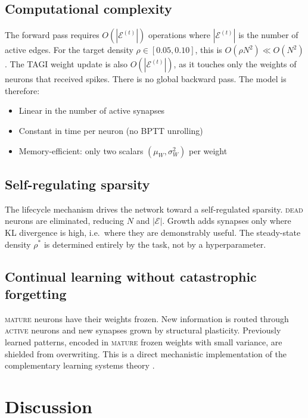 \documentclass[12pt, a4paper]{article}
\newcommand{\mW}{\mu_{W}}
\newcommand{\sW}{\sigma^{2}_{W}}
\begin{document}
\subsection{Computational complexity}

The forward pass requires $O(|\mathcal{E}^{(t)}|)$ operations where
$|\mathcal{E}^{(t)}|$ is the number of active edges. For the target density
$\rho \in [0.05, 0.10]$, this is $O(\rho N^2) \ll O(N^2)$. The TAGI weight update is
also $O(|\mathcal{E}^{(t)}|)$, as it touches only the weights of neurons that received
spikes. There is no global backward pass. The model is therefore:
\begin{itemize}
    \item Linear in the number of active synapses
    \item Constant in time per neuron (no BPTT unrolling)
    \item Memory-efficient: only two scalars $(\mW, \sW)$ per weight
\end{itemize}

\subsection{Self-regulating sparsity}

The lifecycle mechanism drives the network toward a self-regulated sparsity. \textsc{dead}
neurons are eliminated, reducing $N$ and $|\mathcal{E}|$. Growth adds synapses only
where KL divergence is high, i.e.\ where they are demonstrably useful. The steady-state
density $\rho^*$ is determined entirely by the task, not by a hyperparameter.

\subsection{Continual learning without catastrophic forgetting}

\textsc{mature} neurons have their weights frozen. New information is routed through
\textsc{active} neurons and new synapses grown by structural plasticity. Previously
learned patterns, encoded in \textsc{mature} frozen weights with small variance, are
shielded from overwriting. This is a direct mechanistic implementation of the
complementary learning systems theory \citep{mcclelland1995complementary}.

\section{Discussion}
\label{sec:discussion}
\end{document}
